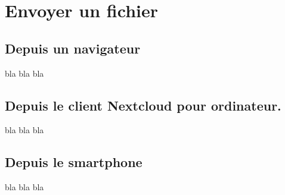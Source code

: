 \chapter{Envoyer un fichier}
\section*{Depuis un navigateur}

bla bla bla

\section*{Depuis le client Nextcloud pour ordinateur.}

bla bla bla

\section*{Depuis le smartphone}

bla bla bla